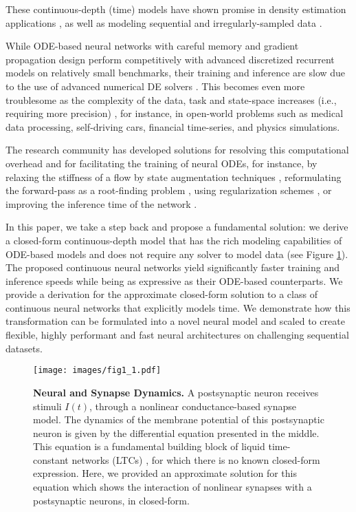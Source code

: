 \documentclass[12pt]{article}
\begin{document}
These continuous-depth (time) models have shown promise in density estimation applications \cite{grathwohl2018ffjord,dupont2019augmented,yang2019pointflow,liebenwein2021sparse}, as well as modeling sequential and irregularly-sampled data \cite{rubanova2019latent,gholami2019anode,lechner2020learning,hasani2021liquid}. 

While ODE-based neural networks with careful memory and gradient propagation design \cite{lechner2020learning} perform competitively with advanced discretized recurrent models on relatively small benchmarks, their training and inference are slow due to the use  of advanced numerical DE solvers \cite{prince1981high}. This becomes even more troublesome as the complexity of the data, task and state-space increases (i.e., requiring more precision) \cite{raissi2019physics}, for instance, in open-world problems such as medical data processing, self-driving cars, financial time-series, and physics simulations.

The research community has developed solutions for resolving this computational overhead and for facilitating the training of neural ODEs, for instance, by relaxing the stiffness of a flow by state augmentation techniques \cite{dupont2019augmented,massaroli2020dissecting}, reformulating the forward-pass as a root-finding problem \cite{bai2019deep}, using regularization schemes \cite{finlay2020train,massaroli2020stable,kidger2020hey}, or improving the inference time of the network \cite{poli2020hypersolvers}.

In this paper, we take a step back and propose a fundamental solution: we derive a closed-form continuous-depth model that has the rich modeling capabilities of ODE-based models and does not require any solver to model data (see Figure \ref{fig:neural_representation}). The proposed continuous neural networks yield significantly faster training and inference speeds while being as expressive as their ODE-based counterparts. We provide a derivation for the approximate closed-form solution to a class of continuous neural networks that explicitly models time. We demonstrate how this transformation can be formulated into a novel neural model and scaled to create flexible, highly performant and fast neural architectures on challenging sequential datasets.

\begin{figure}[t]
	\centering
	\texttt{[image: images/fig1\_1.pdf]}
	\caption{\textbf{Neural and Synapse Dynamics.} A postsynaptic neuron receives stimuli $I(t)$, through a nonlinear conductance-based synapse model. The dynamics of the membrane potential of this postsynaptic neuron is given by the differential equation presented in the middle. This equation is a fundamental building block of liquid time-constant networks (LTCs) \cite{hasani2021liquid}, for which there is no known closed-form expression. Here, we provided an approximate solution for this equation which shows the interaction of nonlinear synapses with a postsynaptic neurons, in closed-form.}
	\label{fig:neural_representation}
\end{figure}
\end{document}

